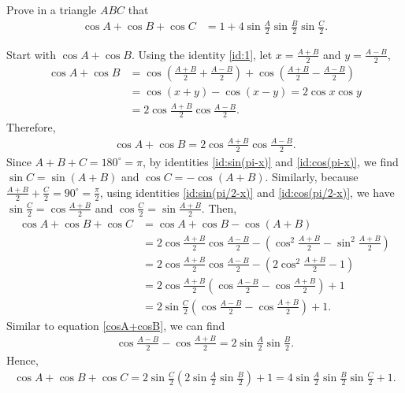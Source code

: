 \documentclass[12pt,a4paper]{memoir}
\theoremstyle{definition}
\begin{document}
\begin{question}
	Prove in a triangle $ABC$ that
	\begin{align}
		\cos{A} +\cos{B}+\cos{C}&=1+4\sin{\frac{A}{2}}\sin{\frac{B}{2}}\sin{\frac{C}{2}}. \label{Q5}
	\end{align}
\end{question}

\begin{solution}
	Start with $\cos A + \cos B$. Using the identity \eqref{id:1}, let $x= \frac{A+B}{2}$ and $y = \frac{A-B}{2}$,
	\begin{align*}
		\cos A + \cos B &= \cos \left(\frac{A+B}{2} + \frac{A-B}{2}\right) + \cos \left(\frac{A+B}{2} - \frac{A-B}{2}\right)\\
		&=\cos(x+y) - \cos(x-y) =2 \cos x \cos y\\
		&= 2 \cos{\frac{A + B}{2}} \cos{\frac{A - B}{2}}.
	\end{align*}
	Therefore,
	\begin{align}
		\cos A + \cos B = 2 \cos{\frac{A + B}{2}} \cos{\frac{A - B}{2}}. \label{cosA+cosB}
	\end{align}
	Since $A + B + C = 180^\circ = \pi$, by identities \eqref{id:sin(pi-x)} and \eqref{id:cos(pi-x)}, we find $\sin C = \sin{(A + B)}$ and $\cos C = -\cos{(A + B)}$. Similarly, because $\frac{A+B}{2} + \frac{C}{2} = 90^\circ = \frac{\pi}{2}$, using identities \eqref{id:sin(pi/2-x)} and \eqref{id:cos(pi/2-x)}, we have $\sin{\frac C 2} = \cos{\frac{A + B}{2}}$ and $\cos{\frac C 2} = \sin{\frac{A + B}{2}}$. Then,
	\begin{align*}
		\cos A + \cos B + \cos C &= \cos A + \cos B - \cos{(A + B)} \\
		&= 2 \cos{\frac{A + B}{2}} \cos{\frac{A - B}{2}} - \left( \cos^2{\frac{A + B}{2}} - \sin^2{\frac{A + B}{2}} \right) \\
		&= 2 \cos{\frac{A + B}{2}} \cos{\frac{A - B}{2}} - \left( 2 \cos^2{\frac{A + B}{2}} - 1 \right) \\
		&=2 \cos{\frac{A + B}{2}} \left( \cos{\frac{A - B}{2}} - \cos{\frac{A + B}{2}} \right) + 1\\
		&= 2 \sin{\frac{C}{2}} \left( \cos{\frac{A - B}{2}} - \cos{\frac{A + B}{2}} \right) + 1.
	\end{align*}
	Similar to equation \eqref{cosA+cosB}, we can find
	\begin{align*}
		\cos{\frac{A - B}{2}} - \cos{\frac{A + B}{2}} = 2 \sin{\frac A 2} \sin{\frac B 2}.
	\end{align*}
	Hence,
	\begin{align*}
		\cos A + \cos B + \cos C = 2 \sin{\frac C 2} \left( 2 \sin{\frac A 2} \sin{\frac B 2} \right) + 1 =4 \sin{\frac A 2} \sin{\frac B 2} \sin{\frac C 2} + 1.
	\end{align*}
\end{solution}
\end{document}

